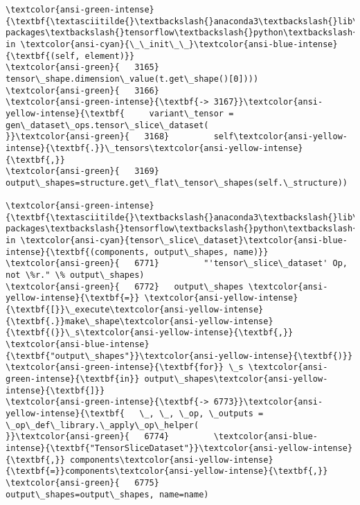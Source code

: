 \documentclass[11pt]{article}
\begin{document}
\begin{Verbatim}[commandchars=\\\{\}, frame=single, framerule=2mm, rulecolor=\color{outerrorbackground}]
\textcolor{ansi-green-intense}{\textbf{\textasciitilde{}\textbackslash{}anaconda3\textbackslash{}lib\textbackslash{}site-packages\textbackslash{}tensorflow\textbackslash{}python\textbackslash{}data\textbackslash{}ops\textbackslash{}dataset\_ops.py}} in \textcolor{ansi-cyan}{\_\_init\_\_}\textcolor{ansi-blue-intense}{\textbf{(self, element)}}
\textcolor{ansi-green}{   3165}           tensor\_shape.dimension\_value(t.get\_shape()[0])))
\textcolor{ansi-green}{   3166} 
\textcolor{ansi-green-intense}{\textbf{-> 3167}}\textcolor{ansi-yellow-intense}{\textbf{     variant\_tensor = gen\_dataset\_ops.tensor\_slice\_dataset(
}}\textcolor{ansi-green}{   3168}         self\textcolor{ansi-yellow-intense}{\textbf{.}}\_tensors\textcolor{ansi-yellow-intense}{\textbf{,}}
\textcolor{ansi-green}{   3169}         output\_shapes=structure.get\_flat\_tensor\_shapes(self.\_structure))

\textcolor{ansi-green-intense}{\textbf{\textasciitilde{}\textbackslash{}anaconda3\textbackslash{}lib\textbackslash{}site-packages\textbackslash{}tensorflow\textbackslash{}python\textbackslash{}ops\textbackslash{}gen\_dataset\_ops.py}} in \textcolor{ansi-cyan}{tensor\_slice\_dataset}\textcolor{ansi-blue-intense}{\textbf{(components, output\_shapes, name)}}
\textcolor{ansi-green}{   6771}         "'tensor\_slice\_dataset' Op, not \%r." \% output\_shapes)
\textcolor{ansi-green}{   6772}   output\_shapes \textcolor{ansi-yellow-intense}{\textbf{=}} \textcolor{ansi-yellow-intense}{\textbf{[}}\_execute\textcolor{ansi-yellow-intense}{\textbf{.}}make\_shape\textcolor{ansi-yellow-intense}{\textbf{(}}\_s\textcolor{ansi-yellow-intense}{\textbf{,}} \textcolor{ansi-blue-intense}{\textbf{"output\_shapes"}}\textcolor{ansi-yellow-intense}{\textbf{)}} \textcolor{ansi-green-intense}{\textbf{for}} \_s \textcolor{ansi-green-intense}{\textbf{in}} output\_shapes\textcolor{ansi-yellow-intense}{\textbf{]}}
\textcolor{ansi-green-intense}{\textbf{-> 6773}}\textcolor{ansi-yellow-intense}{\textbf{   \_, \_, \_op, \_outputs = \_op\_def\_library.\_apply\_op\_helper(
}}\textcolor{ansi-green}{   6774}         \textcolor{ansi-blue-intense}{\textbf{"TensorSliceDataset"}}\textcolor{ansi-yellow-intense}{\textbf{,}} components\textcolor{ansi-yellow-intense}{\textbf{=}}components\textcolor{ansi-yellow-intense}{\textbf{,}}
\textcolor{ansi-green}{   6775}                               output\_shapes=output\_shapes, name=name)


\end{Verbatim}
\end{document}
